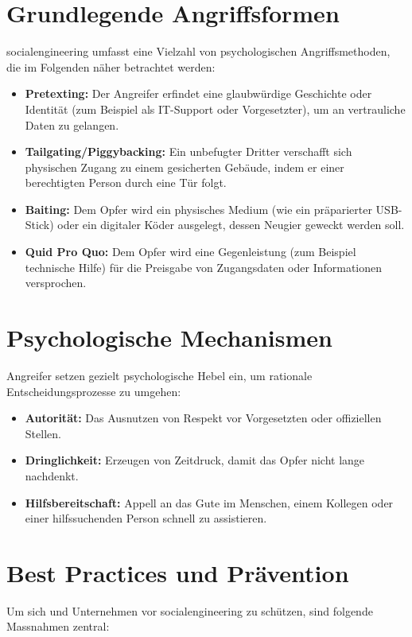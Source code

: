 \documentclass[12pt,a4paper]{article}
\begin{document}
\section{Grundlegende Angriffsformen}
\gls{socialengineering} umfasst eine Vielzahl von psychologischen Angriffsmethoden, die im Folgenden näher betrachtet werden:
\begin{itemize}
    \item \textbf{Pretexting:} Der Angreifer erfindet eine glaubwürdige Geschichte oder Identität (zum Beispiel als IT-Support oder Vorgesetzter), um an vertrauliche Daten zu gelangen.
    \item \textbf{Tailgating/Piggybacking:} Ein unbefugter Dritter verschafft sich physischen Zugang zu einem gesicherten Gebäude, indem er einer berechtigten Person durch eine Tür folgt.
    \item \textbf{Baiting:} Dem Opfer wird ein physisches Medium (wie ein präparierter USB-Stick) oder ein digitaler Köder ausgelegt, dessen Neugier geweckt werden soll.
    \item \textbf{Quid Pro Quo:} Dem Opfer wird eine Gegenleistung (zum Beispiel technische Hilfe) für die Preisgabe von Zugangsdaten oder Informationen versprochen.
\end{itemize}
                                                   
\section{Psychologische Mechanismen}
Angreifer setzen gezielt psychologische Hebel ein, um rationale Entscheidungsprozesse zu umgehen:
\begin{itemize}
    \item \textbf{Autorität:} Das Ausnutzen von Respekt vor Vorgesetzten oder offiziellen Stellen.
    \item \textbf{Dringlichkeit:} Erzeugen von Zeitdruck, damit das Opfer nicht lange nachdenkt.
    \item \textbf{Hilfsbereitschaft:} Appell an das Gute im Menschen, einem Kollegen oder einer hilfssuchenden Person schnell zu assistieren.
\end{itemize}

\section{Best Practices und Prävention}
Um sich und Unternehmen vor \gls{socialengineering} zu schützen, sind folgende Massnahmen zentral:
\end{document}
